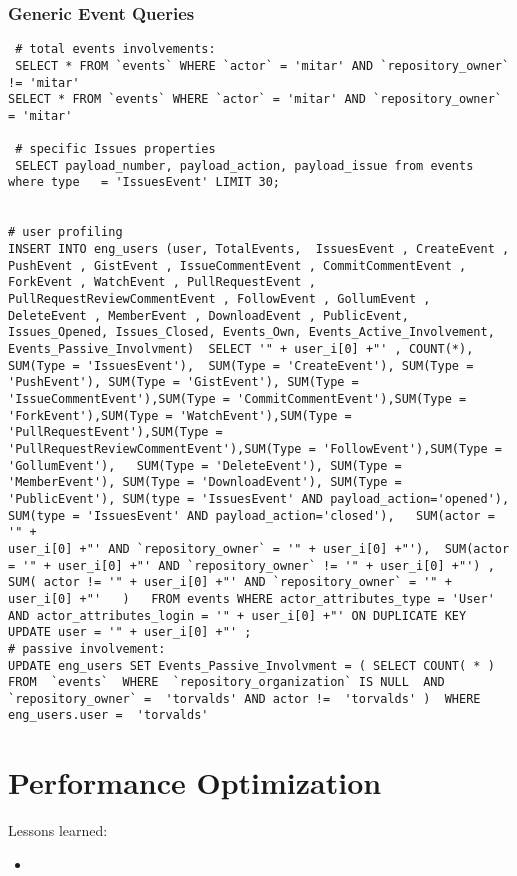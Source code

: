 \documentclass[a4paper,10pt]{article}
\begin{document}
\subsubsection{Generic Event Queries}
\begin{lstlisting}
 # total events involvements:
 SELECT * FROM `events` WHERE `actor` = 'mitar' AND `repository_owner` != 'mitar'
SELECT * FROM `events` WHERE `actor` = 'mitar' AND `repository_owner` = 'mitar'

 # specific Issues properties
 SELECT payload_number, payload_action, payload_issue from events where type   = 'IssuesEvent' LIMIT 30;


# user profiling
INSERT INTO eng_users (user, TotalEvents,  IssuesEvent , CreateEvent , PushEvent , GistEvent , IssueCommentEvent , CommitCommentEvent , ForkEvent , WatchEvent , PullRequestEvent , PullRequestReviewCommentEvent , FollowEvent , GollumEvent , DeleteEvent , MemberEvent , DownloadEvent , PublicEvent, Issues_Opened, Issues_Closed, Events_Own, Events_Active_Involvement, Events_Passive_Involvment)  SELECT '" + user_i[0] +"' , COUNT(*),  SUM(Type = 'IssuesEvent'),  SUM(Type = 'CreateEvent'), SUM(Type = 'PushEvent'), SUM(Type = 'GistEvent'), SUM(Type = 'IssueCommentEvent'),SUM(Type = 'CommitCommentEvent'),SUM(Type = 'ForkEvent'),SUM(Type = 'WatchEvent'),SUM(Type = 'PullRequestEvent'),SUM(Type = 'PullRequestReviewCommentEvent'),SUM(Type = 'FollowEvent'),SUM(Type = 'GollumEvent'),   SUM(Type = 'DeleteEvent'), SUM(Type = 'MemberEvent'), SUM(Type = 'DownloadEvent'), SUM(Type = 'PublicEvent'), SUM(type = 'IssuesEvent' AND payload_action='opened'), SUM(type = 'IssuesEvent' AND payload_action='closed'),   SUM(actor = '" + 
user_i[0] +"' AND `repository_owner` = '" + user_i[0] +"'),  SUM(actor = '" + user_i[0] +"' AND `repository_owner` != '" + user_i[0] +"') , SUM( actor != '" + user_i[0] +"' AND `repository_owner` = '" + user_i[0] +"'   )   FROM events WHERE actor_attributes_type = 'User' AND actor_attributes_login = '" + user_i[0] +"' ON DUPLICATE KEY UPDATE user = '" + user_i[0] +"' ;
# passive involvement:
UPDATE eng_users SET Events_Passive_Involvment = ( SELECT COUNT( * )  FROM  `events`  WHERE  `repository_organization` IS NULL  AND   `repository_owner` =  'torvalds' AND actor !=  'torvalds' )  WHERE eng_users.user =  'torvalds'
\end{lstlisting}


\section{Performance Optimization}
Lessons learned:
\begin{itemize}
 \item 
\end{itemize}
\end{document}

